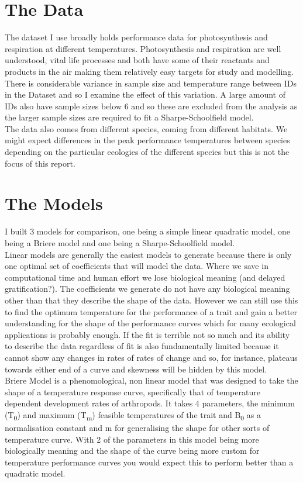 \documentclass[12pt]{article}
\begin{document}
  \section{The Data}
  The dataset I use broadly holds performance data for photosynthesis and respiration at different temperatures. 
  Photosynthesis and respiration are well understood, vital life processes and both have some of their reactants 
  and products in the air making them relatively easy targets for study and modelling. There is considerable variance 
  in sample size and temperature range between IDs in the Dataset and so I examine the effect of this variation. 
  A large amount of IDs also have sample sizes below 6 
  and so these are excluded from the analysis as the larger sample sizes are required to fit a Sharpe-Schoolfield model. \\
  The data also comes from different species, coming from different habitats. We might expect differences in the peak performance 
  temperatures between species depending on the particular ecologies of the different species but this is not the focus 
  of this report.\\
 
  \section{The Models}
  I built 3 models for comparison, one being a simple linear quadratic model, one being a Briere model and one being a Sharpe-Schoolfield model.\\
  Linear models are generally the easiest models to generate because there is only one optimal set of coefficients that will model the data. 
  Where we save in computational time and human effort we lose biological meaning (and delayed gratification?). The coefficients we generate 
  do not have any biological meaning other than that they describe the shape of the data. However we can still use this to find the optimum 
  temperature for the performance of a trait and gain a better understanding for the shape of the performance curves which for many ecological 
  applications is probably enough. If the fit is terrible not so much and its ability to describe the data regardless of fit is also 
  fundamentally limited because it cannot show any changes in rates of rates of change and so, for instance, plateaus towards either end of a 
  curve and skewness will be hidden by this model.\\
  Briere Model \cite{Brierea} is a phenomological, non linear model that was designed to take the shape of a temperature response curve, 
  specifically that of temperature dependent development rates of arthropods. It takes 4 parameters, the minimum (T\textsubscript{0}) and maximum (T\textsubscript{m}) 
  feasible temperatures of the trait and B\textsubscript{0} as a normalisation constant and m for generalising the shape for other sorts of temperature
   curve. With 2 of the parameters in this model being more biologically meaning and the shape of the curve being more custom for temperature
    performance curves you would expect this to perform better than a quadratic model.\\
\end{document}
